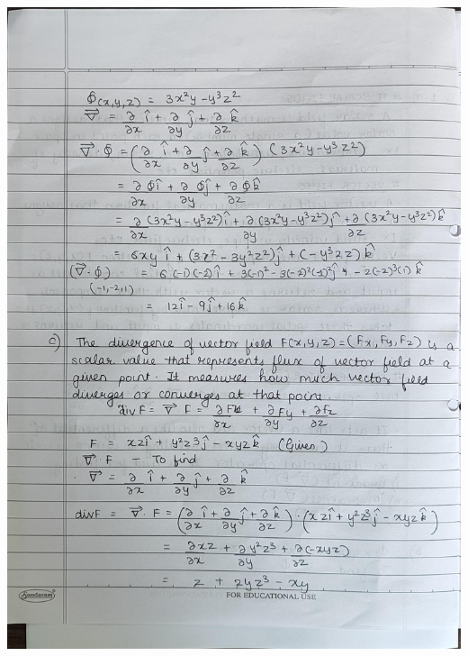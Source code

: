 \documentclass{exam}
\begin{document}
\newpage
\begin{center}
	\includegraphics[scale=0.23]{2.jpeg} 
\end{center}
\end{document}
